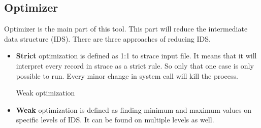 \subsection{Optimizer}
Optimizer is the main part of this tool.
This part will reduce the intermediate data structure (IDS).
There are three approaches of reducing IDS.
\begin{itemize}
	\item \textbf{Strict}
	optimization is defined as 1:1 to strace input file.
	It means that it will interpret every record in strace as a strict rule.
	So only that one case is only possible to run.
	Every minor change in system call will kill the process.

	\begin{algorithm}[H]



		\caption{Weak optimization}\label{algo:weak}
	\end{algorithm}

	\item \textbf{Weak}
	optimization is defined as finding minimum and maximum values on specific levels of IDS.
	It can be found on multiple levels as well.

	\begin{algorithm}[H]




\end{algorithm}
\end{itemize}
